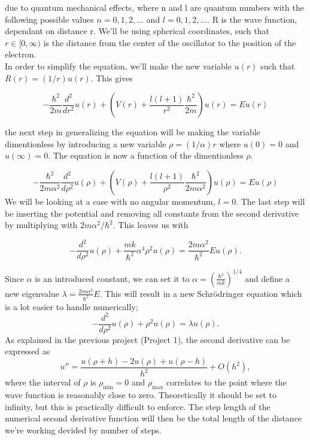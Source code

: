 \documentclass[12pt]{article}
\begin{document}
due to quantum mechanical effects, where n and l are quantum numbers with the following possible values $n=0,1,2,\dots$ and
$l=0,1,2,\dots$. R is the wave function, dependant on distance r. We'll be using spherical coordinates, such that $r\in [0,\infty)$ is the distance from the center of the oscillator to the position of the electron.\\

In order to simplify the equation, we'll make the new variable $u(r)$ such that $R(r) = (1/r) u(r)$. This gives

\begin{equation*}
  -\frac{\hbar^2}{2 m} \frac{d^2}{dr^2} u(r) + \left ( V(r) + \frac{l (l + 1)}{r^2}\frac{\hbar^2}{2 m}\right ) u(r)  = E u(r)
\end{equation*}

the next step in generalizing the equation will be making the variable dimentionless by introducing a new variable $\rho = (1/\alpha) r$ where  $u(0)=0$ and $u(\infty)=0$. The equation is now a function of the dimentionless $\rho$.

\begin{equation*}
  -\frac{\hbar^2}{2 m \alpha^2} \frac{d^2}{d\rho^2} u(\rho)+ \left ( V(\rho) + \frac{l (l + 1)}{\rho^2}\frac{\hbar^2}{2 m\alpha^2} \right ) u(\rho)  = E u(\rho)
\end{equation*}
We will be looking at a case with no angular momentum, $l=0$. The last step will be inserting the potential and removing all constants from the second derivative by multiplying with $2m\alpha^2/\hbar^2$. This leaves us with

\begin{equation*}
  -\frac{d^2}{d\rho^2} u(\rho) 
       + \frac{mk}{\hbar^2} \alpha^4\rho^2u(\rho)  = \frac{2m\alpha^2}{\hbar^2}E u(\rho) .
\end{equation*}

Since $\alpha$ is an introduced constant, we can set it to $\alpha  = \left(\frac{\hbar^2}{mk}\right)^{1/4}$ and define a new eigenvalue $\lambda = \frac{2m\alpha^2}{\hbar^2}E$. This will result in a new Schrödringer equation which is a lot easier to handle numerically;
\begin{equation*}
  -\frac{d^2}{d\rho^2} u(\rho) + \rho^2u(\rho)  = \lambda u(\rho) .
\end{equation*}
As explained in the previous project (Project 1), the second derivative can be expressed as
\begin{equation}
    u''=\frac{u(\rho+h) -2u(\rho) +u(\rho-h)}{h^2} +O(h^2),
    \label{eq:diffoperation}
\end{equation}
where the interval of $\rho$ is $\rho_{\mathrm{min}}=0$ and
$\rho_{\mathrm{max}}$ correlates to the point where the wave function is reasonably close to zero. Theoretically it should be set to infinity, but this is practically difficult to enforce. The step length of the numerical second derivative function will then be the total length of the distance we're working devided by number of steps.
\end{document}

